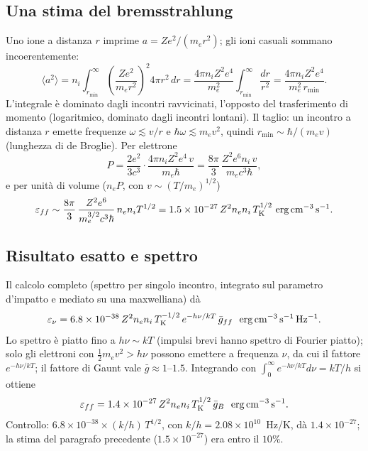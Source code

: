 \subsection{Una stima del bremsstrahlung}
Uno ione a distanza $r$ imprime $a=Ze^2/(m_er^2)$; gli ioni casuali sommano incoerentemente:
\begin{equation}
\langle a^2\rangle=n_i\int_{r_{\min}}^\infty\left(\frac{Ze^2}{m_er^2}\right)^2 4\pi r^2\,dr
=\frac{4\pi n_iZ^2e^4}{m_e^2}\int_{r_{\min}}^\infty\frac{dr}{r^2}=\frac{4\pi n_iZ^2e^4}{m_e^2\,r_{\min}} .
\end{equation}
L'integrale è dominato dagli incontri ravvicinati, l'opposto del trasferimento di momento (logaritmico, dominato dagli incontri lontani).
Il taglio: un incontro a distanza $r$ emette frequenze $\omega\lesssim v/r$ e $\hbar\omega\lesssim m_ev^2$, quindi $r_{\min}\sim\hbar/(m_ev)$ (lunghezza di de Broglie). Per elettrone
\begin{equation}
P=\frac{2e^2}{3c^3}\cdot\frac{4\pi n_iZ^2e^4\,v}{m_e\hbar}=\frac{8\pi}{3}\,\frac{Z^2e^6n_i\,v}{m_ec^3\hbar},
\end{equation}
e per unità di volume ($n_eP$, con $v\sim(T/m_e)^{1/2}$)
\begin{equation}
\varepsilon_{ff}\sim\frac{8\pi}{3}\,\frac{Z^2e^6}{m_e^{3/2}c^3\hbar}\,n_en_iT^{1/2}
=1.5\times10^{-27}\,Z^2n_en_i\,T_{\rm K}^{1/2}\ \mathrm{erg\,cm^{-3}\,s^{-1}}.
\end{equation}

\subsection{Risultato esatto e spettro}
Il calcolo completo (spettro per singolo incontro, integrato sul parametro d'impatto e mediato su una maxwelliana) dà
\begin{equation}
\varepsilon_\nu=6.8\times10^{-38}\,Z^2n_en_i\,T_{\rm K}^{-1/2}\,e^{-h\nu/kT}\,\bar g_{ff}\ \ \mathrm{erg\,cm^{-3}\,s^{-1}\,Hz^{-1}}.
\end{equation}
Lo spettro è piatto fino a $h\nu\sim kT$ (impulsi brevi hanno spettro di Fourier piatto); solo gli elettroni con $\frac12m_ev^2>h\nu$ possono emettere a frequenza $\nu$, da cui il fattore $e^{-h\nu/kT}$; il fattore di Gaunt vale $\bar g\approx1$--$1.5$.
Integrando con $\int_0^\infty e^{-h\nu/kT}d\nu=kT/h$ si ottiene
\begin{equation}
\varepsilon_{ff}=1.4\times10^{-27}\,Z^2n_en_i\,T_{\rm K}^{1/2}\,\bar g_B\ \ \mathrm{erg\,cm^{-3}\,s^{-1}}.
\end{equation}
Controllo: $6.8\times10^{-38}\times(k/h)\,T^{1/2}$, con $k/h=2.08\times10^{10}$~Hz/K, dà $1.4\times10^{-27}$; la stima del paragrafo precedente ($1.5\times10^{-27}$) era entro il $10\%$.

